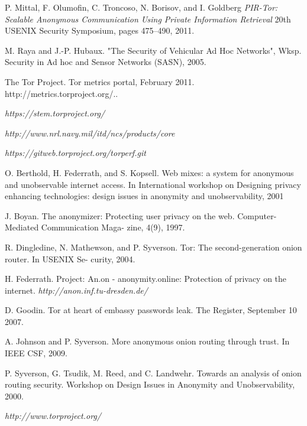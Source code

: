 \documentclass{acm_proc_article-sp}
\begin{document}
\begin{thebibliography}{1}

 P. Mittal, F. Olumofin, C. Troncoso, N. Borisov, and  I.  Goldberg {\em PIR-Tor: Scalable Anonymous Communication Using Private Information Retrieval} 20th USENIX Security Symposium, pages 475–490, 2011.

 M. Raya and J.-P. Hubaux. "The Security of Vehicular Ad Hoc Networks",  Wksp. Security in Ad hoc and Sensor Networks (SASN),  2005.

 The Tor Project. Tor metrics portal, February 2011. http://metrics.torproject.org/..

 {\em https://stem.torproject.org/}

 {\em http://www.nrl.navy.mil/itd/ncs/products/core}

 {\em https://gitweb.torproject.org/torperf.git}

 O. Berthold, H. Federrath, and S. Kopsell. Web mixes: a system for anonymous and unobservable internet access. In International workshop on Designing privacy enhancing technologies:  design issues in anonymity and unobservability, 2001

 J. Boyan. The anonymizer: Protecting user privacy on the web. Computer-Mediated Communication Maga- zine, 4(9), 1997.

 R. Dingledine, N. Mathewson, and P. Syverson. Tor: The second-generation onion router.  In USENIX Se- curity, 2004.

 H. Federrath. Project: An.on - anonymity.online: Protection of privacy on the internet.  {\em http://anon.inf.tu-dresden.de/ }

 D. Goodin.  Tor at heart of embassy passwords leak.
The Register, September 10 2007.

 A. Johnson and P. Syverson. More anonymous onion routing through trust. In IEEE CSF, 2009.

 P. Syverson, G. Tsudik, M. Reed, and C. Landwehr.
Towards an analysis of onion routing security. Workshop on Design Issues in Anonymity and Unobservability, 2000.

 {\em http://www.torproject.org/}

\end{thebibliography}
\end{document}
